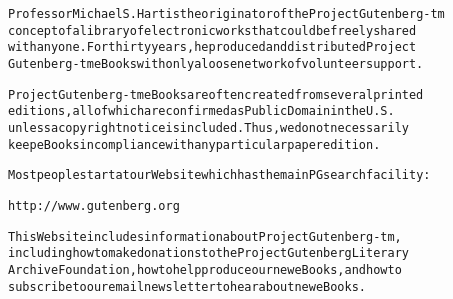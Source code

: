 \documentclass[12pt,leqno]{book}[2005/09/16]
\newenvironment{PGtext}{%
\begin{alltt}
\fontsize{9.2}{10.5}\ttfamily\selectfont}%
{\end{alltt}}
\begin{document}
\begin{PGtext}
Professor Michael S. Hart is the originator of the Project Gutenberg-tm
concept of a library of electronic works that could be freely shared
with anyone.  For thirty years, he produced and distributed Project
Gutenberg-tm eBooks with only a loose network of volunteer support.


Project Gutenberg-tm eBooks are often created from several printed
editions, all of which are confirmed as Public Domain in the U.S.
unless a copyright notice is included.  Thus, we do not necessarily
keep eBooks in compliance with any particular paper edition.


Most people start at our Web site which has the main PG search facility:

     http://www.gutenberg.org

This Web site includes information about Project Gutenberg-tm,
including how to make donations to the Project Gutenberg Literary
Archive Foundation, how to help produce our new eBooks, and how to
subscribe to our email newsletter to hear about new eBooks.
\end{PGtext}

\end{document}
